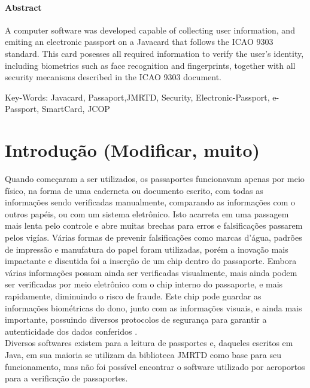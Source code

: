 \documentclass{article}
\begin{document}
	\paragraph{\large Abstract}
		\begin{justify}

			\hspace{2cm} A computer software was developed capable of collecting user information, and emiting an electronic passport on a Javacard that follows the ICAO 9303 standard. This card posesses all required information to verify the user's identity, including biometrics such as face recognition and fingerprints, together with all security mecanisms described in the ICAO 9303 document.

	\vspace*{10px}
Key-Words: Javacard, Passaport,JMRTD, Security, Electronic-Passport, e-Passport, SmartCard, JCOP

		\end{justify}
	
	\newpage

	\tableofcontents
	\listoffigures
	\newpage

	\pagenumbering{arabic}

	\section{Introdução (Modificar, muito)}
		\begin{justify}
			
			\hspace{2cm} Quando começaram a ser utilizados, os passaportes funcionavam apenas por meio físico, na forma de uma caderneta ou documento escrito, com todas as informações sendo verificadas manualmente, comparando as informações com o outros papéis, ou com um sistema eletrônico.\cite{PASSPORTWIKI} Isto acarreta em uma passagem mais lenta pelo controle e abre muitas brechas para erros e falsificações passarem pelos vigías. Várias formas de prevenir falsificações como marcas d’água, padrões de impressão e manufatura do papel foram utilizadas, porém a inovação mais impactante e discutida foi a inserção de um chip dentro do passaporte. Embora várias informações possam ainda ser verificadas visualmente, mais ainda podem ser verificadas por meio eletrônico com o chip interno do passaporte, e mais rapidamente, diminuindo o risco de fraude. Este chip pode guardar as informações biométricas do dono, junto com as informações visuais, e ainda mais importante, possuindo diversos protocolos de segurança para garantir a autenticidade dos dados conferidos \cite{HOWPASSPORT}.\\
			\hspace*{2cm} Diversos softwares existem para a leitura de passportes e, daqueles escritos em Java, em sua maioria se utilizam da biblioteca JMRTD\cite{JMRTD} como base para seu funcionamento, mas não foi possível encontrar o software utilizado por aeroportos para a verificação de passaportes. 

			
		\end{justify}
\end{document}
